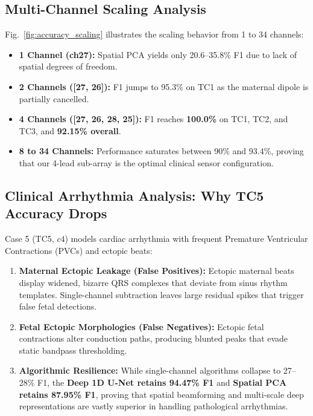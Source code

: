 \documentclass[10pt,twocolumn,letterpaper]{article}
\newcommand{\newcontent}[1]{\textcolor{midtermblue}{#1}}
\begin{document}
\newcontent{\subsection{Multi-Channel Scaling Analysis}
Fig.~\ref{fig:accuracy_scaling} illustrates the scaling behavior from 1 to 34 channels:
\begin{itemize}
    \item \textbf{1 Channel (ch27):} Spatial PCA yields only 20.6--35.8\% F1 due to lack of spatial degrees of freedom.
    \item \textbf{2 Channels ([27, 26]):} F1 jumps to 95.3\% on TC1 as the maternal dipole is partially cancelled.
    \item \textbf{4 Channels ([27, 26, 28, 25]):} F1 reaches \textbf{100.0\%} on TC1, TC2, and TC3, and \textbf{92.15\% overall}.
    \item \textbf{8 to 34 Channels:} Performance saturates between 90\% and 93.4\%, proving that our 4-lead sub-array is the optimal clinical sensor configuration.
\end{itemize}
}

\newcontent{\subsection{Clinical Arrhythmia Analysis: Why TC5 Accuracy Drops}
Case 5 (TC5, $c4$) models cardiac arrhythmia with frequent Premature Ventricular Contractions (PVCs) and ectopic beats:
\begin{enumerate}
    \item \textbf{Maternal Ectopic Leakage (False Positives):} Ectopic maternal beats display widened, bizarre QRS complexes that deviate from sinus rhythm templates. Single-channel subtraction leaves large residual spikes that trigger false fetal detections.
    \item \textbf{Fetal Ectopic Morphologies (False Negatives):} Ectopic fetal contractions alter conduction paths, producing blunted peaks that evade static bandpass thresholding.
    \item \textbf{Algorithmic Resilience:} While single-channel algorithms collapse to 27--28\% F1, the \textbf{Deep 1D U-Net retains 94.47\% F1} and \textbf{Spatial PCA retains 87.95\% F1}, proving that spatial beamforming and multi-scale deep representations are vastly superior in handling pathological arrhythmias.
\end{enumerate}
}
\end{document}
